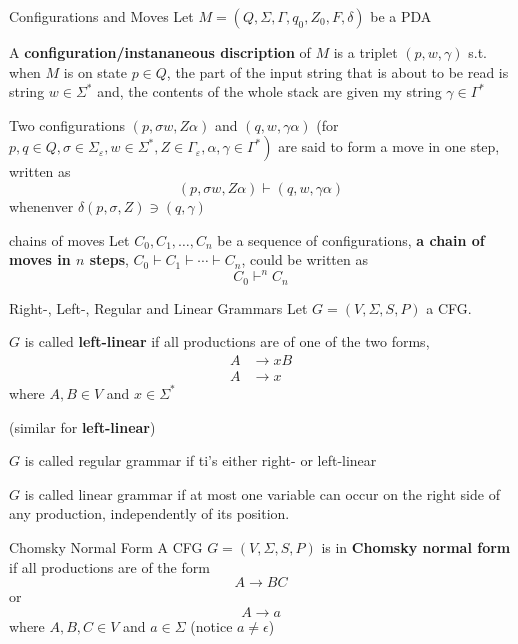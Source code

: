 \documentclass[a4paper]{article}
\begin{document}
\begin{Definition}{Configurations and Moves}{}
	Let $M=\left(Q, \Sigma, \Gamma, q_{0}, Z_{0}, F, \delta\right)$ be a PDA

	A  \textbf{configuration/instananeous discription} of $M$ is a triplet  $(p, w, \gamma)$ s.t. when  $M$ is on state  $p \in Q$, the part of the input string that is about to be read is string $w \in \Sigma^*$ and, the contents of the whole stack are given my string $\gamma \in \Gamma^*$ 

	Two configurations $(p, \sigma w, Z \alpha)$ and $(q, w, \gamma \alpha)$ (for $\left.p, q \in Q, \sigma \in \Sigma_{\varepsilon}, w \in \Sigma^{*}, Z \in \Gamma_{\varepsilon}, \alpha, \gamma \in \Gamma^{*}\right)$ are said to form a move in one step, written as \[
	(p, \sigma w, Z \alpha) \vdash(q, w, \gamma \alpha)
	\] whenenver $\delta(p, \sigma, Z) \ni(q, \gamma)$
\end{Definition}

\begin{Definition}{chains of moves}{}
	Let $C_0, C_1, \ldots, C_n$ be a sequence of configurations, \textbf{a chain of moves in $n$ steps}, $C_{0} \vdash C_{1} \vdash \cdots \vdash C_{n}$, could be written as  \[
	C_{0} \vdash^{n} C_{n}
	\]  
\end{Definition}

\begin{Definition}{Right-, Left-, Regular and Linear Grammars}{}
	Let $G = \left( V, \Sigma, S, P \right) $ a CFG.

	$G$ is called  \textbf{left-linear} if all productions are of one of the two forms,
	\begin{align*}
		A & \to  xB \\
		A &\to x
	\end{align*} where $A, B \in V$ and $x \in \Sigma^*$

	(similar for  \textbf{left-linear})

	$G$ is called regular grammar if ti's either right- or left-linear

	 $G$ is called linear grammar if at most one variable can occur on the right side of any production, independently of its position.

\end{Definition}

\begin{Definition}{Chomsky Normal Form}{}
	A CFG $G = \left( V, \Sigma, S, P \right) $ is in \textbf{Chomsky normal form} if all productions are of the form \[
	A \to  BC
	\]  or \[
	A\to a
\] where $A,B,C \in V$ and $a \in \Sigma$ (notice $a \neq \epsilon$)
\end{Definition}
\end{document}
